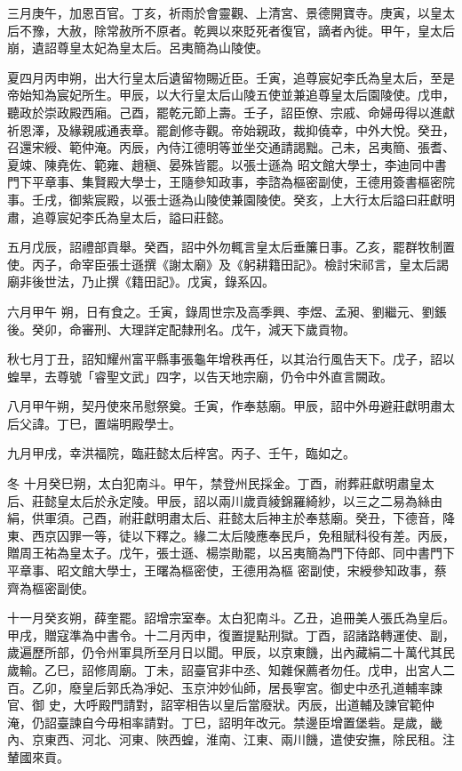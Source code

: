 \begin{pinyinscope}
 三月庚午，加恩百官。丁亥，祈雨於會靈觀、上清宮、景德開寶寺。庚寅，以皇太后不豫，大赦，除常赦所不原者。乾興以來貶死者復官，謫者內徙。甲午，皇太后崩，遺詔尊皇太妃為皇太后。呂夷簡為山陵使。



 夏四月丙申朔，出大行皇太后遺留物賜近臣。壬寅，追尊宸妃李氏為皇太后，至是帝始知為宸妃所生。甲辰，以大行皇太后山陵五使並兼追尊皇太后園陵使。戊申，聽政於崇政殿西廂。己酉，罷乾元節上壽。壬子，詔臣僚、宗戚、命婦毋得以進獻祈恩澤，及緣親戚通表章。罷創修寺觀。帝始親政，裁抑僥幸，中外大悅。癸丑，召還宋綬、範仲淹。丙辰，內侍江德明等並坐交通請謁黜。己未，呂夷簡、張耆、夏竦、陳堯佐、範雍、趙稹、晏殊皆罷。以張士遜為
 昭文館大學士，李迪同中書門下平章事、集賢殿大學士，王隨參知政事，李諮為樞密副使，王德用簽書樞密院事。壬戌，御紫宸殿，以張士遜為山陵使兼園陵使。癸亥，上大行太后謚曰莊獻明肅，追尊宸妃李氏為皇太后，謚曰莊懿。



 五月戊辰，詔禮部貢舉。癸酉，詔中外勿輒言皇太后垂簾日事。乙亥，罷群牧制置使。丙子，命宰臣張士遜撰《謝太廟》及《躬耕籍田記》。檢討宋祁言，皇太后謁廟非後世法，乃止撰《籍田記》。戊寅，錄系囚。



 六月甲午
 朔，日有食之。壬寅，錄周世宗及高季興、李煜、孟昶、劉繼元、劉鋹後。癸卯，命審刑、大理詳定配隸刑名。戊午，減天下歲貢物。



 秋七月丁丑，詔知耀州富平縣事張龜年增秩再任，以其治行風告天下。戊子，詔以蝗旱，去尊號「睿聖文武」四字，以告天地宗廟，仍令中外直言闕政。



 八月甲午朔，契丹使來吊慰祭奠。壬寅，作奉慈廟。甲辰，詔中外毋避莊獻明肅太后父諱。丁巳，置端明殿學士。



 九月甲戌，幸洪福院，臨莊懿太后梓宮。丙子、壬午，臨如之。



 冬
 十月癸巳朔，太白犯南斗。甲午，禁登州民採金。丁酉，祔葬莊獻明肅皇太后、莊懿皇太后於永定陵。甲辰，詔以兩川歲貢綾錦羅綺紗，以三之二易為絲由絹，供軍須。己酉，祔莊獻明肅太后、莊懿太后神主於奉慈廟。癸丑，下德音，降東、西京囚罪一等，徒以下釋之。緣二太后陵應奉民戶，免租賦科役有差。丙辰，贈周王祐為皇太子。戊午，張士遜、楊崇勛罷，以呂夷簡為門下侍郎、同中書門下平章事、昭文館大學士，王曙為樞密使，王德用為樞
 密副使，宋綬參知政事，蔡齊為樞密副使。



 十一月癸亥朔，薛奎罷。詔增宗室奉。太白犯南斗。乙丑，追冊美人張氏為皇后。甲戌，贈寇準為中書令。十二月丙申，復置提點刑獄。丁酉，詔諸路轉運使、副，歲遍歷所部，仍令州軍具所至月日以聞。甲辰，以京東饑，出內藏絹二十萬代其民歲輸。乙巳，詔修周廟。丁未，詔臺官非中丞、知雜保薦者勿任。戊申，出宮人二百。乙卯，廢皇后郭氏為凈妃、玉京沖妙仙師，居長寧宮。御史中丞孔道輔率諫官、御
 史，大呼殿門請對，詔宰相告以皇后當廢狀。丙辰，出道輔及諫官範仲淹，仍詔臺諫自今毋相率請對。丁巳，詔明年改元。禁邊臣增置堡砦。是歲，畿內、京東西、河北、河東、陜西蝗，淮南、江東、兩川饑，遣使安撫，除民租。注輦國來貢。




\end{pinyinscope}
